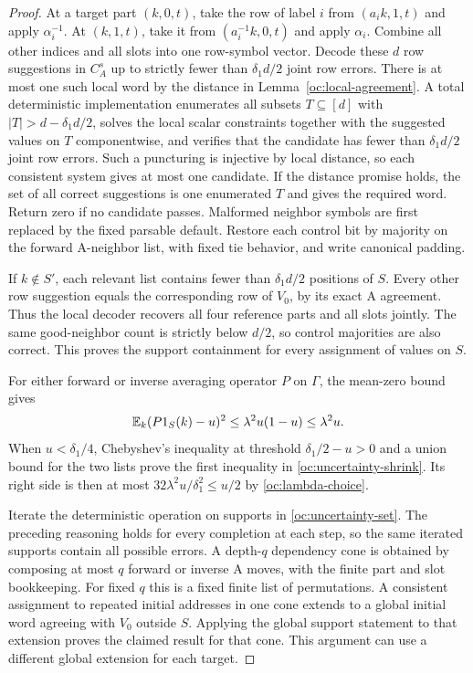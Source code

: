 \begin{proof}
At a target part $(k,0,t)$, take the row of label $i$ from
$(a_ik,1,t)$ and apply $\alpha_i^{-1}$.  At $(k,1,t)$, take it from
$(a_i^{-1}k,0,t)$ and apply $\alpha_i$.  Combine all other indices
and all slots into one row-symbol vector.  Decode these $d$ row
suggestions in $C_A^s$ up to strictly fewer than $\delta_1d/2$
joint row errors.  There is at most one such local word by the
distance in Lemma~\ref{oc:local-agreement}.  A total deterministic
implementation enumerates all subsets $T\subseteq[d]$ with
$|T|>d-\delta_1d/2$, solves the local scalar constraints together
with the suggested values on $T$ componentwise, and verifies that
the candidate has fewer than $\delta_1d/2$ joint row errors.
Such a puncturing is injective by local distance, so each consistent
system gives at most one candidate.  If the distance promise holds,
the set of all correct suggestions is one enumerated $T$ and gives
the required word.  Return zero if no candidate passes.  Malformed
neighbor symbols are first replaced by the fixed parsable default.
Restore each control bit by majority on the forward A-neighbor list,
with fixed tie behavior, and write canonical padding.

If $k\notin S'$, each relevant list contains fewer than
$\delta_1d/2$ positions of $S$.  Every other row suggestion equals
the corresponding row of $V_0$, by its exact A agreement.  Thus the
local decoder recovers all four reference parts and all slots
jointly.  The same good-neighbor count is strictly below $d/2$, so
control majorities are also correct.  This proves the support
containment for every assignment of values on $S$.

For either forward or inverse averaging operator $P$ on $\Gamma$,
the mean-zero bound gives
\[
 \mathbb{E}_k(P1_S(k)-u)^2
 \le\lambda^2u(1-u)\le\lambda^2u.
\]
When $u<\delta_1/4$, Chebyshev's inequality at threshold
$\delta_1/2-u>0$ and a union bound for the two lists prove the first
inequality in \eqref{oc:uncertainty-shrink}.  Its right side is then
at most $32\lambda^2u/\delta_1^2\le u/2$ by
\eqref{oc:lambda-choice}.

Iterate the deterministic operation on supports in
\eqref{oc:uncertainty-set}.  The preceding reasoning holds for every
completion at each step, so the same iterated supports contain all
possible errors.  A depth-$q$ dependency cone is obtained by
composing at most $q$ forward or inverse A moves, with the finite
part and slot bookkeeping.  For fixed $q$ this is a fixed finite
list of permutations.  A consistent assignment to repeated initial
addresses in one cone extends to a global initial word agreeing
with $V_0$ outside $S$.  Applying the global support statement to
that extension proves the claimed result for that cone.  This
argument can use a different global extension for each target.


\end{proof}
